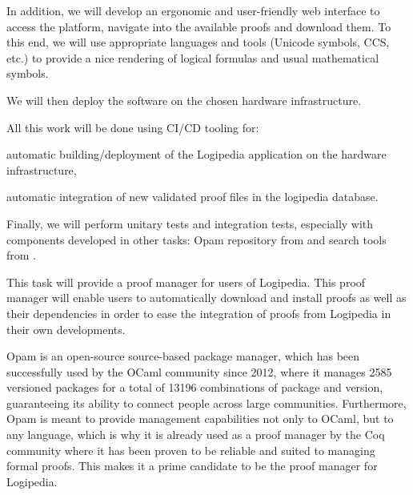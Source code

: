 \begin{workpackage}[id=access,type=RTD,wphases=1-48,
  short=Access,%
  title={Access},
  lead=Inr,InrRM=48,OcaRM=6,EduRM=12]
\begin{tasklist}
\begin{task}[id=web,
      title=Giving access to the infrastructure on the world-wide web,
      lead=Inr,InrRM=18,wphases=7-24]
    In addition, we will develop an ergonomic and user-friendly web
    interface to access the platform, navigate into the available
    proofs and download them. To this end, we will use appropriate
    languages and tools (Unicode symbols, CCS, etc.) to provide a nice
    rendering of logical formulas and usual mathematical symbols.
    
    We will then deploy the software on the chosen hardware
    infrastructure.

    All this work will be done using CI/CD tooling for:
    \begin{compactitem}
    \item automatic building/deployment of the Logipedia application
      on the hardware infrastructure,
    \item automatic integration of new validated proof files in the
      logipedia database.
    \end{compactitem}

    Finally, we will perform unitary tests and integration tests,
    especially with components developed in other tasks: Opam
    repository from  and search tools from
    .
  \end{task}

  \begin{task}[id=opam,
      title=Giving access to the infrastructure in proof systems,
      lead=Oca,OcaRM=6,wphases=15-24]
    This task will provide a proof manager for users of Logipedia. This proof
    manager will enable users to automatically download and install
    proofs as well as their dependencies in order to ease the
    integration of proofs from Logipedia in their own developments.

    Opam \cite{OPAM} is an open-source source-based package manager,
    which has been successfully used by the OCaml community since
    2012, where it manages 2585 versioned packages for a total of
    13196 combinations of package and version, guaranteeing its
    ability to connect people across large communities. Furthermore,
    Opam is meant to provide management capabilities not only to
    OCaml, but to any language, which is why it is already used as a
    proof manager by the Coq community where it has been proven to be
    reliable and suited to managing formal proofs. This makes it a
    prime candidate to be the proof manager for Logipedia.


\end{task}
\end{tasklist}
\end{workpackage}
